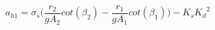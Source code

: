 \begin{equation}
  a_{h1} = \sigma_s 
  \bigg(\frac{r_2}{gA_2}cot(\beta_2)-\frac{r_1}{gA_1}cot(\beta_1)\bigg)-K_s{K_d}^2
\end{equation}



 
%
%
%
%
%
%



